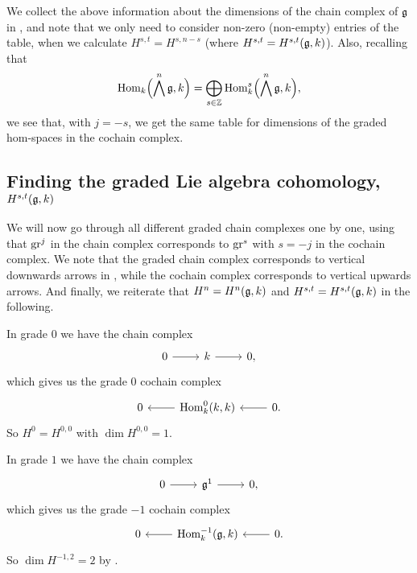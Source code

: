 We collect the above information about the dimensions of the chain complex of $\mathfrak{g}$ in , and note that we only need to consider non-zero (non-empty) entries of the table, when we calculate  $H^{s,t} = H^{s,n-s}$ (where $H^{s,t} = H^{s,t}(\mathfrak{g},k)$). Also, recalling that
\begin{equation*}
  \operatorname{Hom}_{k}\Bigl( \bigwedge^{n}\mathfrak{g}, k \Bigr) = \bigoplus_{s \in \mathbb{Z}} \operatorname{Hom}_{k}^{s}\Bigl( \bigwedge^{n}\mathfrak{g}, k \Bigr),
\end{equation*}
we see that, with $j=-s$, we get the same table for dimensions of the graded hom-spaces in the cochain complex.

\subsection{Finding the graded Lie algebra cohomology, \texorpdfstring{$H^{s,t}(\mathfrak{g},k)$}{H(s,t)(g,k)}}%
\label{subsec:graded-coh-GL2}

We will now go through all different graded chain complexes one by one, using that $\operatorname{gr}^{j}$ in the chain complex corresponds to $\operatorname{gr}^{s}$ with $s = -j$ in the cochain complex. We note that the graded chain complex corresponds to vertical downwards arrows in , while the cochain complex corresponds to vertical upwards arrows. And finally, we reiterate that $H^{n} = H^{n}(\mathfrak{g},k)$ and $H^{s,t} = H^{s,t}(\mathfrak{g},k)$ in the following.

In grade $0$ we have the chain complex
\[
  \begin{tikzcd}
    0 \ar[r] & k \ar[r] & 0,
  \end{tikzcd}
\]
which gives us the grade $0$ cochain complex
\[
  \begin{tikzcd}
    0 & \ar[l] \Hom_{k}^{0}(k,k) & \ar[l] 0.
  \end{tikzcd}
\]
So $H^{0} = H^{0,0}$ with $\dim H^{0,0} = 1$.

In grade $1$ we have the chain complex
\[
  \begin{tikzcd}
    0 \ar[r] & \lie{g}^{1} \ar[r] & 0,
  \end{tikzcd}
\]
which gives us the grade $-1$ cochain complex
\[
  \begin{tikzcd}
    0 & \ar[l] \Hom_{k}^{-1}(\lie{g},k) & \ar[l] 0.
  \end{tikzcd}
\]
So $\dim H^{-1,2} = 2$ by .

